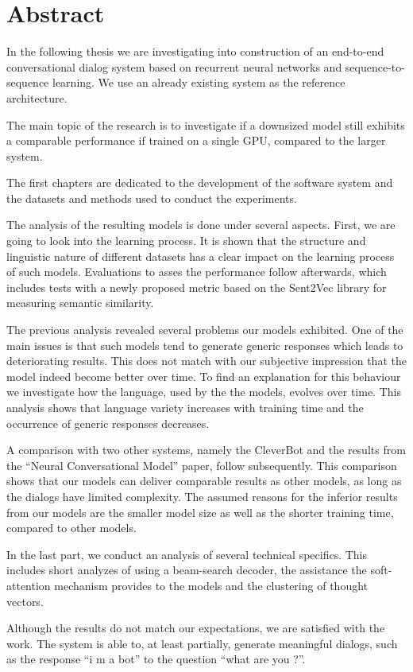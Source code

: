 \chapter*{Abstract}
In the following thesis we are investigating into construction of an end-to-end conversational dialog system based on recurrent neural networks and sequence-to-sequence learning. We use an already existing system as the reference architecture. 

The main topic of the research is to investigate if a downsized model still exhibits a comparable performance if trained on a single GPU, compared to the larger system.

The first chapters are dedicated to the development of the software system and the datasets and methods used to conduct the experiments.

The analysis of the resulting models is done under several aspects. First, we are going to look into the learning process. It is shown that the structure and linguistic nature of different datasets has a clear impact on the learning process of such models. Evaluations to asses the performance follow afterwards, which includes tests with a newly proposed metric based on the Sent2Vec library for measuring semantic similarity.

The previous analysis revealed several problems our models exhibited. One of the main issues is that such models tend to generate generic responses which leads to deteriorating results. This does not match with our subjective impression that the model indeed become better over time. To find an explanation for this behaviour we investigate how the language, used by the the models, evolves over time. This analysis shows that language variety increases with training time and the occurrence of generic responses decreases.

A comparison with two other systems, namely the CleverBot and the results from the ``Neural Conversational Model'' paper, follow subsequently. This comparison shows that our models can deliver comparable results as other models, as long as the dialogs have limited complexity. The assumed reasons for the inferior results from our models are the smaller model size as well as the shorter training time, compared to other models.

In the last part, we conduct an analysis of several technical specifics. This includes short analyzes of using a beam-search decoder, the assistance the soft-attention mechanism provides to the models and the clustering of thought vectors. 

Although the results do not match our expectations, we are satisfied with the work. The system is able to, at least partially, generate meaningful dialogs, such as the response ``i m a bot'' to the question ``what are you ?''.
